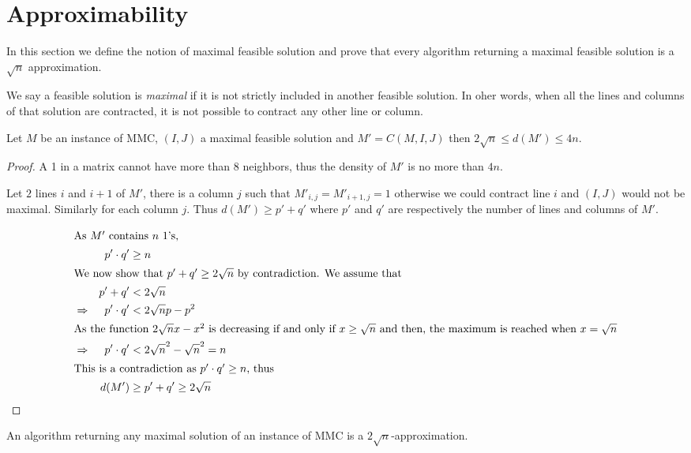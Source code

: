 \section{Approximability}

In this section we define the notion of maximal feasible solution and prove that every algorithm returning a maximal feasible solution is a $\sqrt{n}$ approximation.

\begin{definition}
We say a feasible solution is \emph{maximal} if it is not strictly included in another feasible solution. In oher words, when all the lines and columns of that solution are contracted, it is not possible to contract any other line or column.
\end{definition}

\begin{theorem}
\label{theo:bounds}
Let $M$ be an instance of MMC, $(I,J)$ a maximal feasible solution and $M' = C(M,I,J)$ then $2 \sqrt{n} \leq d(M') \leq 4n$.
\end{theorem}
\begin{proof}
A 1 in a matrix cannot have more than $8$ neighbors, thus the density of $M'$ is no more than $4n$.

Let $2$ lines $i$ and $i+1$ of $M'$, there is a column $j$ such that $M'_{i,j} = M'_{i+1,j} = 1$ otherwise we could contract line $i$ and $(I,J)$ would not be maximal. Similarly for each column $j$. Thus $d(M') \geq p'+q'$ where $p'$ and $q'$ are respectively the number of lines and columns of $M'$.

\begin{align*}
\intertext{As $M'$ contains $n$ 1's,}
&& p'\cdot q' &\geq n\\
\intertext{We now show that $p'+q' \geq 2 \sqrt{n}$ by contradiction. We assume that}
&& p' + q' &< 2 \sqrt{n}\\
&\Rightarrow& p' \cdot q' &< 2\sqrt{n}p - p^2\\
\intertext{As the function $2\sqrt{n} x - x^2$ is decreasing if and only if $x \geq \sqrt{n}$ and then, the maximum is reached when $x = \sqrt{n}$}
&\Rightarrow& p' \cdot q' &< 2 \sqrt{n}^2 - \sqrt{n}^2 = n \\
\intertext{This is a contradiction as $p' \cdot q' \geq n$, thus}
&& d(M') &\geq p' + q' \geq 2 \sqrt{n}
\end{align*}

\end{proof}


\begin{corol}
An algorithm returning any maximal solution of an instance of MMC is a $2\sqrt{n}$-approximation.
\end{corol}


